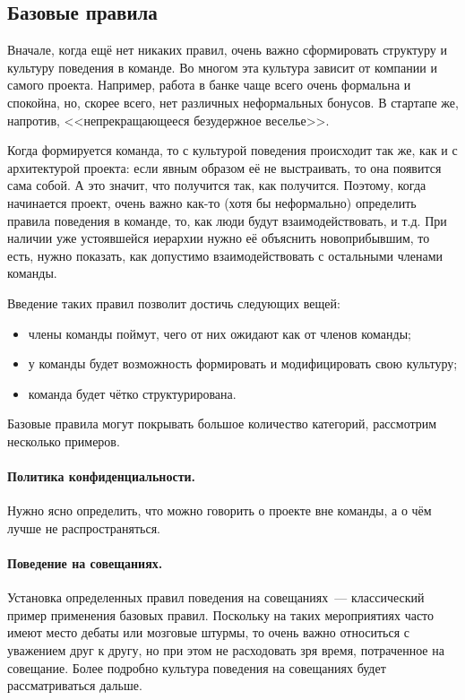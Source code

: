 \documentclass{../../text-style}
\begin{document}
\subsection{Базовые правила}

Вначале, когда ещё нет никаких правил, очень важно сформировать структуру и культуру поведения в команде. Во многом эта культура зависит от компании и самого проекта. Например, работа в банке чаще всего очень формальна и спокойна, но, скорее всего, нет различных неформальных бонусов. В стартапе же, напротив, <<непрекращающееся безудержное веселье>>. 

Когда формируется команда, то с культурой поведения происходит так же, как и с архитектурой проекта: если явным образом её не выстраивать, то она появится сама собой. А это значит, что получится так, как получится. Поэтому, когда начинается проект, очень важно как-то (хотя бы неформально) определить правила поведения в команде, то, как люди будут взаимодействовать, и т.д. При наличии уже устоявшейся иерархии нужно её объяснить новоприбывшим, то есть, нужно показать, как допустимо взаимодействовать с остальными членами команды.

Введение таких правил позволит достичь следующих вещей:

\begin{itemize}
    \item члены команды поймут, чего от них ожидают как от членов команды;
    \item у команды будет возможность формировать и модифицировать свою культуру;
    \item команда будет чётко структурирована.
\end{itemize}

Базовые правила могут покрывать большое количество категорий, рассмотрим несколько примеров.

\paragraph*{Политика конфиденциальности.} Нужно ясно определить, что можно говорить о проекте вне команды, а о чём лучше не распространяться.

\paragraph*{Поведение на совещаниях.} Установка определенных правил поведения на совещаниях~--- классический пример применения базовых правил. Поскольку на таких мероприятиях часто имеют место дебаты или мозговые штурмы, то очень важно относиться с уважением друг к другу, но при этом не расходовать зря время, потраченное на совещание. Более подробно культура поведения на совещаниях будет рассматриваться дальше.
\end{document}
